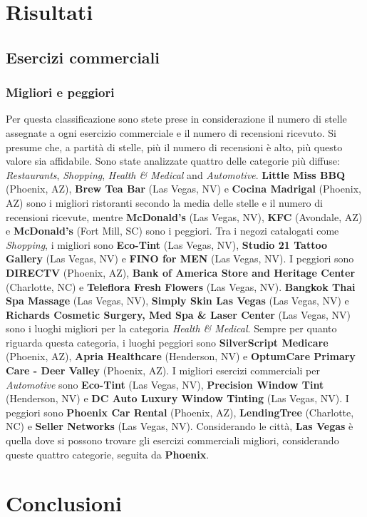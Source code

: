 \documentclass[12pt]{article}
\begin{document}
\section{Risultati}
\subsection{Esercizi commerciali}
\subsubsection{Migliori e peggiori}
Per questa classificazione sono stete prese in considerazione il numero di stelle assegnate a ogni esercizio commerciale e il numero di recensioni ricevuto. Si presume che, a partità di stelle, più il numero di recensioni è alto, più questo valore sia affidabile. \newline
Sono state analizzate quattro delle categorie più diffuse: \textit{Restaurants}, \textit{Shopping}, \textit{Health \& Medical} and \textit{Automotive}.\newline
\textbf{Little Miss BBQ} (Phoenix, AZ), \textbf{Brew Tea Bar} (Las Vegas, NV) e \textbf{Cocina Madrigal} (Phoenix, AZ) sono i migliori ristoranti secondo la media delle stelle e il numero di recensioni ricevute, mentre \textbf{McDonald's} (Las Vegas, NV), \textbf{KFC} (Avondale, AZ) e \textbf{McDonald's} (Fort Mill, SC) sono i peggiori.\newline
Tra i negozi catalogati come \textit{Shopping}, i migliori sono \textbf{Eco-Tint} (Las Vegas, NV), \textbf{Studio 21 Tattoo Gallery} (Las Vegas, NV) e \textbf{FINO for MEN} (Las Vegas, NV). I peggiori sono \textbf{DIRECTV} (Phoenix, AZ), \textbf{Bank of America Store and Heritage Center} (Charlotte, NC) e \textbf{Teleflora Fresh Flowers} (Las Vegas, NV). \newline
\textbf{Bangkok Thai Spa Massage} (Las Vegas, NV), \textbf{Simply Skin Las Vegas} (Las Vegas, NV) e \textbf{Richards Cosmetic Surgery, Med Spa \& Laser Center} (Las Vegas, NV) sono i luoghi migliori per la categoria \textit{Health \& Medical}. Sempre per quanto riguarda questa categoria, i luoghi peggiori sono \textbf{SilverScript Medicare} (Phoenix, AZ), \textbf{Apria Healthcare} (Henderson, NV) e \textbf{OptumCare Primary Care - Deer Valley} (Phoenix, AZ).\newline
I migliori esercizi commerciali per \textit{Automotive} sono \textbf{Eco-Tint} (Las Vegas, NV), \textbf{Precision Window Tint} (Henderson, NV) e \textbf{DC Auto Luxury Window Tinting} (Las Vegas, NV). I peggiori sono \textbf{Phoenix Car Rental} (Phoenix, AZ), \textbf{LendingTree} (Charlotte, NC) e \textbf{Seller Networks} (Las Vegas, NV).\newline
Considerando le città, \textbf{Las Vegas} è quella dove si possono trovare gli esercizi commerciali migliori, considerando queste quattro categorie, seguita da \textbf{Phoenix}.



\section{Conclusioni}

\printbibliography[title={Riferimenti}]
\end{document}
